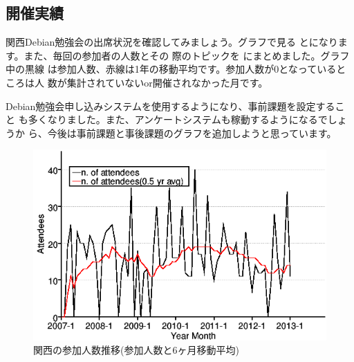 \documentclass[mingoth,a4paper]{jsarticle}
\begin{document}
\subsection{開催実績}

関西Debian勉強会の出席状況を確認してみましょう。グラフで見る
とになります。また、毎回の参加者の人数とその
際のトピックを  にまとめました。グラフ中の黒線
は参加人数、赤線は1年の移動平均です。参加人数が$0$となっているところは人
数が集計されていないor開催されなかった月です。

Debian勉強会申し込みシステムを使用するようになり、事前課題を設定すること
も多くなりました。また、アンケートシステムも稼動するようになるでしょうか
ら、今後は事前課題と事後課題のグラフを追加しようと思っています。
%
\begin{figure}[h]
  \begin{center}
    \includegraphics[width=.6\hsize]{image201212/memberanalysis/kansai.png}
  \end{center}
  \caption{関西の参加人数推移(参加人数と6ヶ月移動平均)}
  \label{fig:kansaipeoplechart}
\end{figure}

\end{document}
